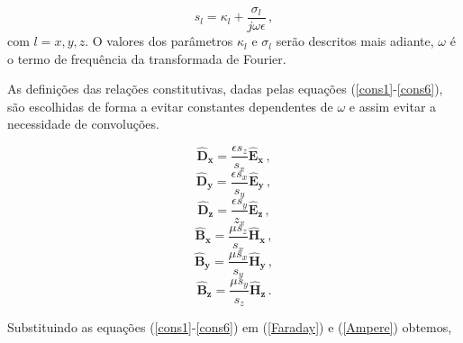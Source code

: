 \documentclass[a4paper,10pt]{article}
\begin{document}
\begin{equation}
 s_l=\kappa_l + \frac{\sigma_l}{j\omega \epsilon}\,,  \label{sigma}
\end{equation}
com $l=x,y,z$. O valores dos parâmetros $\kappa_l$ e $\sigma_l$ serão descritos mais adiante, $\omega$ é o termo de frequência da transformada de Fourier.

As definições das relações constitutivas, dadas pelas equações (\ref{cons1}-\ref{cons6}), são escolhidas de forma a evitar constantes dependentes de $\omega$ e assim evitar a necessidade de convoluções.

\begin{equation}
\mathbf{\hat{D}_x}=\dfrac{\epsilon s_z}{s_x}\mathbf{\hat{E}_x}\,, \label{cons1}
\end{equation}
\begin{equation}
\mathbf{\hat{D}_y}=\dfrac{\epsilon s_x}{s_y}\mathbf{\hat{E}_y}\,,\label{cons2}
\end{equation}
\begin{equation}
\mathbf{\hat{D}_z}=\dfrac{\epsilon s_y}{z_x} \mathbf{\hat{E}_z}\,,\label{cons3}
\end{equation}
\begin{equation}
\mathbf{\hat{B}_x}=\dfrac{\mu s_z}{s_x}\mathbf{\hat{H}_x}\,,\label{cons4}
\end{equation}
\begin{equation}
\mathbf{\hat{B}_y}=\dfrac{\mu s_x}{s_y}\mathbf{\hat{H}_y}\,,\label{cons5}
\end{equation}
\begin{equation}
\mathbf{\hat{B}_z}=\dfrac{\mu s_y}{s_z}\mathbf{\hat{H}_z}\,.\label{cons6}
\end{equation}

Substituindo as equações (\ref{cons1}-\ref{cons6}) em  (\ref{Faraday}) e (\ref{Ampere}) obtemos,
\end{document}
